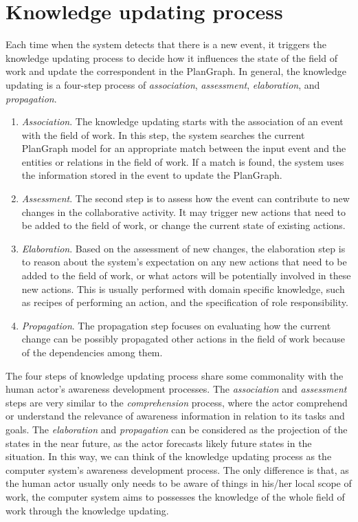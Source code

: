 \section{Knowledge updating process} %
\label{sec:knowledge_updating_process}
Each time when the system detects that there is a new event, it triggers the knowledge updating process to decide how it influences the state of the field of work and update the correspondent in the PlanGraph. In general, the knowledge updating is a four-step process of \emph{association}, \emph{assessment}, \emph{elaboration}, and \emph{propagation}.
\begin{enumerate}
	\item \emph{Association}. The knowledge updating starts with the association of an event with the field of work. In this step, the system searches the current PlanGraph model for an appropriate match between the input event and the entities or relations in the field of work. If a match is found, the system uses the information stored in the event to update the PlanGraph.
	\item \emph{Assessment}. The second step is to assess how the event can contribute to new changes in the collaborative activity. It may trigger new actions that need to be added to the field of work, or change the current state of existing actions. 
	\item \emph{Elaboration}. Based on the assessment of new changes, the elaboration step is to reason about the system's expectation on any new actions that need to be added to the field of work, or what actors will be potentially involved in these new actions. This is usually performed with domain specific knowledge, such as recipes of performing an action, and the specification of role responsibility.
	\item \emph{Propagation}. The propagation step focuses on evaluating how the current change can be possibly propagated other actions in the field of work because of the dependencies among them. 
\end{enumerate}

The four steps of knowledge updating process share some commonality with the human actor's awareness development processes. The \emph{association} and \emph{assessment} steps are very similar to the \emph{comprehension} process, where the actor comprehend or understand the relevance of awareness information in relation to its tasks and goals. The \emph{elaboration} and \emph{propagation} can be considered as the projection of the states in the near future, as the actor forecasts likely future states in the situation. In this way, we can think of the knowledge updating process as the computer system's awareness development process. The only difference is that, as the human actor usually only needs to be aware of things in his/her local scope of work, the computer system aims to possesses the knowledge of the whole field of work through the knowledge updating.

